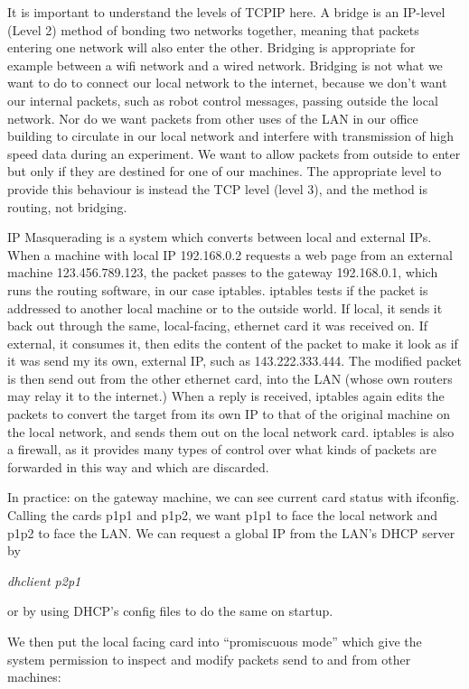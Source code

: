\documentclass[oneside,english]{scrbook}
\begin{document}
It is important to understand the levels of TCPIP here. A bridge is
an IP-level (Level 2) method of bonding two networks together, meaning that packets
entering one network will also enter the other. Bridging is appropriate
for example between a wifi network and a wired network. Bridging is
not what we want to do to connect our local network to the internet,
because we don't want our internal packets, such as robot control
messages, passing outside the local network. Nor do we want packets
from other uses of the LAN in our office building to circulate in
our local network and interfere with  transmission of high speed data
during an experiment. We want to allow packets from outside to enter
but only if they are destined for one of our machines. The appropriate
level to provide this behaviour is instead the TCP level (level 3), and the method
is routing, not bridging.

IP Masquerading is a system which converts between local and external
IPs. When a machine with local IP 192.168.0.2 requests a web page
from an external machine 123.456.789.123, the packet passes to the
gateway 192.168.0.1, which runs the routing software, in our case
iptables. iptables tests if the packet is addressed to another local
machine or to the outside world. If local, it sends it back out through
the same, local-facing, ethernet card it was received on. If external,
it consumes it, then edits the content of the packet to make it look
as if it was send my its own, external IP, such as 143.222.333.444.
The modified packet is then send out from the other ethernet card,
into the LAN (whose own routers may relay it to the internet.) When
a reply is received, iptables again edits the packets to convert the
target from its own IP to that of the original machine on the local
network, and sends them out on the local network card. iptables is
also a firewall, as it provides many types of control over what kinds
of packets are forwarded in this way and which are discarded.

In practice: on the gateway machine, we can see current card status
with ifconfig. Calling the cards p1p1 and p1p2, we want p1p1 to face
the local network and p1p2 to face the LAN. We can request a global
IP from the LAN's DHCP server by 

\emph{dhclient p2p1}

or by using DHCP's config files to do the same on startup.

We then put the local facing card into ``promiscuous mode'' which
give the system permission to inspect and modify packets send to and
from other machines:
\end{document}
